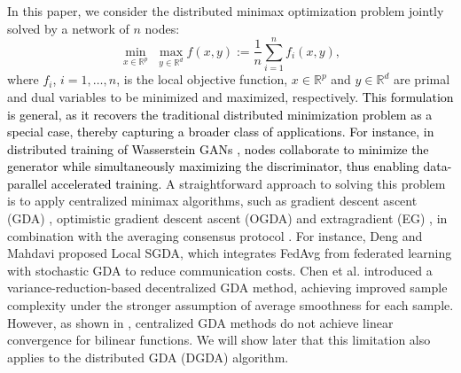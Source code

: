 \documentclass[10pt,a4paper]{amsart}
\def \hy #1{\textcolor{black}{#1}}
\begin{document}
In this paper, we consider the distributed minimax optimization problem jointly solved by a network of $n$ nodes:
\begin{equation}\label{Prob_minimax}
\underset{x\in \mathbb{R} ^p}{\min}\,\,\underset{y\in \mathbb{R} ^d}{\max}f\left( x,y \right) :=\frac{1}{n}\sum_{i=1}^n{f_i\left( x,y \right)},
\end{equation}
where $f_i$, $i=1,\dots,n$, is the local objective function, $x\in \mathbb{R} ^p$ and $y\in \mathbb{R} ^d$ are primal and dual variables to be minimized and maximized, respectively.
\hy{This formulation is general, as it recovers the traditional distributed minimization problem \cite{nedic2018distributed} as a special case, thereby capturing a broader class of applications. For instance, in distributed training of Wasserstein GANs \cite{liu2020decentralized, huang2024achieving}, nodes collaborate to minimize the generator while simultaneously maximizing the discriminator, thus enabling data-parallel accelerated training.}
A straightforward approach to solving this problem is to apply centralized minimax algorithms, such as gradient descent ascent (GDA) \cite{dem1972numerical}, optimistic gradient descent ascent (OGDA) \cite{daskalakis2017training} and extragradient (EG) \cite{korpelevich1976extragradient}, in combination with the averaging consensus protocol \cite{xiao2006distributed}. 
For instance, Deng and Mahdavi \cite{deng2021local} proposed Local SGDA, which integrates FedAvg from federated learning \cite{mcmahan2017communication} with stochastic GDA to reduce communication costs. Chen et al. \cite{chen2024efficient} introduced a variance-reduction-based decentralized GDA method, achieving improved sample complexity under the stronger assumption of average smoothness for each sample. However, as shown in \cite{mokhtari2020unified}, centralized GDA methods do not achieve linear convergence for bilinear functions. We will show later that this limitation also applies to the distributed GDA (DGDA) algorithm.
\end{document}
